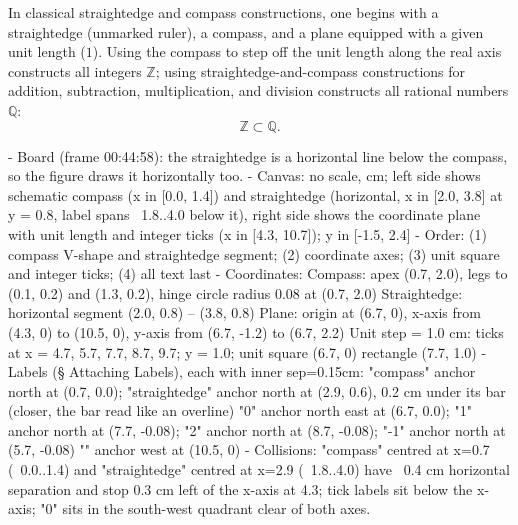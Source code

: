 \begin{content}
In classical straightedge and compass constructions, one begins with a straightedge (unmarked ruler), a compass, and a plane equipped with a given unit length ($1$). Using the compass to step off the unit length along the real axis constructs all integers $\mathbb{Z}$; using straightedge-and-compass constructions for addition, subtraction, multiplication, and division constructs all rational numbers $\mathbb{Q}$:
\[
\mathbb{Z} \subset \mathbb{Q}.
\]

\begin{hidden}
- Board (frame 00:44:58): the straightedge is a horizontal line below the compass, so the figure draws it horizontally too.
- Canvas: no scale, cm; left side shows schematic compass (x in [0.0, 1.4]) and straightedge (horizontal, x in [2.0, 3.8] at y = 0.8, label spans ~1.8..4.0 below it), right side shows the coordinate plane with unit length and integer ticks (x in [4.3, 10.7]); y in [-1.5, 2.4]
- Order: (1) compass V-shape and straightedge segment; (2) coordinate axes; (3) unit square and integer ticks; (4) all text last
- Coordinates:
  Compass: apex (0.7, 2.0), legs to (0.1, 0.2) and (1.3, 0.2), hinge circle radius 0.08 at (0.7, 2.0)
  Straightedge: horizontal segment (2.0, 0.8) -- (3.8, 0.8)
  Plane: origin at (6.7, 0), x-axis from (4.3, 0) to (10.5, 0), y-axis from (6.7, -1.2) to (6.7, 2.2)
  Unit step = 1.0 cm: ticks at x = 4.7, 5.7, 7.7, 8.7, 9.7; y = 1.0; unit square (6.7, 0) rectangle (7.7, 1.0)
- Labels (§ Attaching Labels), each with inner sep=0.15cm:
  "compass" anchor north at (0.7, 0.0); "straightedge" anchor north at (2.9, 0.6), 0.2 cm under its bar (closer, the bar read like an overline)
  "0" anchor north east at (6.7, 0.0); "1" anchor north at (7.7, -0.08); "2" anchor north at (8.7, -0.08); "-1" anchor north at (5.7, -0.08)
  "" anchor west at (10.5, 0)
- Collisions: "compass" centred at x=0.7 (~0.0..1.4) and "straightedge" centred at x=2.9 (~1.8..4.0) have ~0.4 cm horizontal separation and stop 0.3 cm left of the x-axis at 4.3; tick labels sit below the x-axis; "0" sits in the south-west quadrant clear of both axes.
\end{hidden}
\begin{center}
\end{center}
\end{content}
